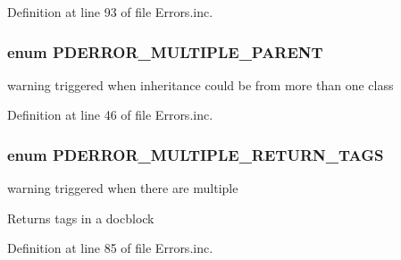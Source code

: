 \-Definition at line 93 of file \-Errors.\-inc.

\hypertarget{_errors_8inc_aa4067eef2227b444cee399368374b6cf}{
\subsubsection[{\-P\-D\-E\-R\-R\-O\-R\-\_\-\-M\-U\-L\-T\-I\-P\-L\-E\-\_\-\-P\-A\-R\-E\-N\-T}]{\setlength{\rightskip}{0pt plus 5cm}enum {\bf \-P\-D\-E\-R\-R\-O\-R\-\_\-\-M\-U\-L\-T\-I\-P\-L\-E\-\_\-\-P\-A\-R\-E\-N\-T}}}\label{_errors_8inc_aa4067eef2227b444cee399368374b6cf}
warning triggered when inheritance could be from more than one class 

\-Definition at line 46 of file \-Errors.\-inc.

\hypertarget{_errors_8inc_a9c46abf67ed58a3331eb2117838a3213}{
\subsubsection[{\-P\-D\-E\-R\-R\-O\-R\-\_\-\-M\-U\-L\-T\-I\-P\-L\-E\-\_\-\-R\-E\-T\-U\-R\-N\-\_\-\-T\-A\-G\-S}]{\setlength{\rightskip}{0pt plus 5cm}enum {\bf \-P\-D\-E\-R\-R\-O\-R\-\_\-\-M\-U\-L\-T\-I\-P\-L\-E\-\_\-\-R\-E\-T\-U\-R\-N\-\_\-\-T\-A\-G\-S}}}\label{_errors_8inc_a9c46abf67ed58a3331eb2117838a3213}
warning triggered when there are multiple \begin{DoxyReturn}{\-Returns}
tags in a docblock 
\end{DoxyReturn}


\-Definition at line 85 of file \-Errors.\-inc.

